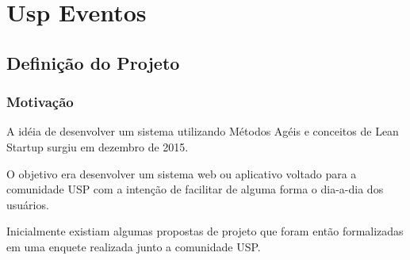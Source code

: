 \chapter{Usp Eventos}
\label{cap:uspeventos}
\section{Definição do Projeto}
\subsection{Motivação}
        \par A idéia de desenvolver um sistema utilizando Métodos Agéis e conceitos de Lean Startup surgiu em dezembro de  2015.
	\par O objetivo era  desenvolver um sistema web ou aplicativo voltado para a comunidade USP com a intenção de facilitar de alguma forma o dia-a-dia dos usuários.
        \par Inicialmente existiam algumas propostas de projeto que foram então formalizadas em uma enquete realizada junto a comunidade USP.
